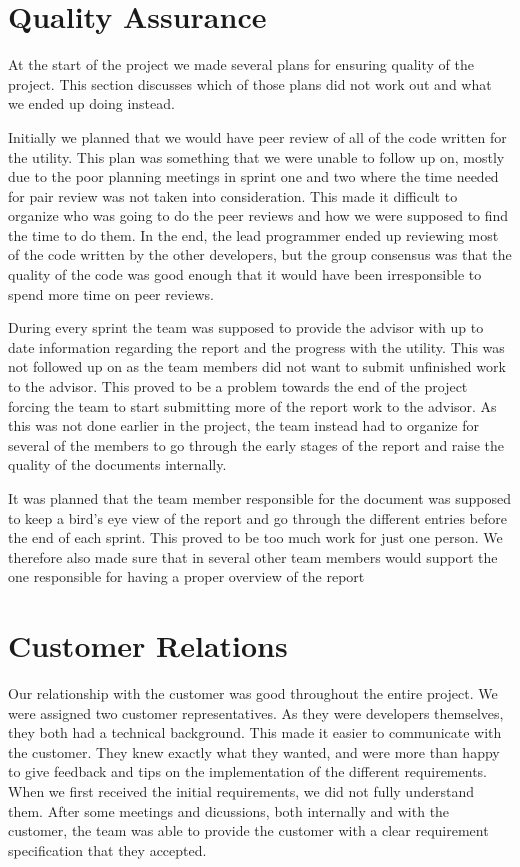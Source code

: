 \section{Quality Assurance}
At the start of the project we made several plans for ensuring quality of the project. This section discusses which of those plans did not work out and what we ended up doing instead.

Initially we planned that we would have peer review of all of the code written for the utility. This plan was something that we were unable to follow up on, mostly due to the poor planning meetings in sprint one and two where the time needed for pair review was not taken into consideration. This made it difficult to organize who was going to do the peer reviews and how we were supposed to find the time to do them. In the end, the lead programmer ended up reviewing most of the code written by the other developers, but the group consensus was that the quality of the code was good enough that it would have been irresponsible to spend more time on peer reviews.

During every sprint the team was supposed to provide the advisor with up to date information regarding the report and the progress with the utility. This was not followed up on as the team members did not want to submit unfinished work to the advisor. This proved to be a problem towards the end of the project forcing the team to start submitting more of the report work to the advisor. As this was not done earlier in the project, the team instead had to organize for several of the members to go through the early stages of the report and raise the quality of the documents internally.

It was planned that the team member responsible for the document was supposed to keep a bird's eye view of the report and go through the different entries before the end of each sprint. This proved to be too much work for just one person. We therefore also made sure that in several other team members would support the one responsible for having a proper overview of the report 

\section{Customer Relations}
Our relationship with the customer was good throughout the entire project.
We were assigned two customer representatives. As they were developers themselves, they both had a technical background. This made it easier to communicate with the customer.
They knew exactly what they wanted, and were more than happy to give feedback and tips on the implementation of the different requirements. When we first received the initial requirements, we did not fully understand them. After some meetings and dicussions, both internally and with the customer, the team was able to provide the customer with a clear requirement specification that they accepted.

